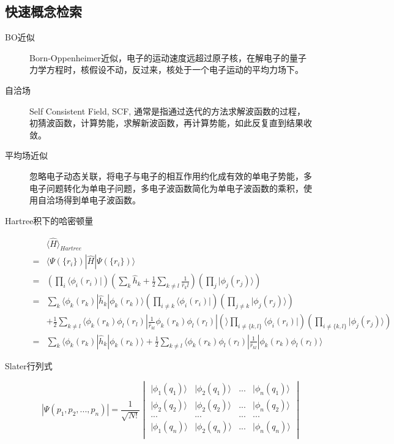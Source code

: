 \documentclass{article}
\numberwithin{equation}{section}
\newcommand{\bra}[1]{\langle #1 |}
\newcommand{\ket}[1]{| #1 \rangle}
\newcommand{\bracketl}[3]{\langle #1 | #2 | #3 \rangle}
\newcommand{\mean}[1]{\langle #1 \rangle}
\begin{document}
    \subsection{快速概念检索}
    \begin{description}
      \item[BO近似] Born-Oppenheimer近似，电子的运动速度远超过原子核，在解电子的量子力学方程时，核假设不动，反过来，核处于一个电子运动的平均力场下。
       
      \item[自洽场] Self Consistent Field, SCF, 通常是指通过迭代的方法求解波函数的过程，初猜波函数，计算势能，求解新波函数，再计算势能，如此反复直到结果收敛。
      
      \item[平均场近似] 忽略电子动态关联，将电子与电子的相互作用约化成有效的单电子势能，多电子问题转化为单电子问题，多电子波函数简化为单电子波函数的乘积，使用自洽场得到单电子波函数。
       
      \item[Hartree积下的哈密顿量] 
      \begin{align*}
        &\mean{\hat{H}}_{Hartree} \\
        =& \bracketl{\Psi(\{r_i\})}{\hat{H}}{\Psi(\{r_i\})}\\
        =&(\prod_i\bra{\phi_i(r_i)})(\sum_k\hat{h}_k+\frac{1}{2}\sum_{k\neq l}\frac{1}{\hat{r}_kl})(\prod_j\ket{\phi_j(r_j)})\\
        =&\sum_k\bracketl{\phi_k(r_k)}{\hat{h}_k}{\phi_k(r_k)}(\prod_{i\neq k}\bra{\phi_i(r_i)})(\prod_{j \neq k}\ket{\phi_j(r_j)})\\
        &+\frac{1}{2}\sum_{k \neq l}\bracketl{\phi_k(r_k)\phi_l(r_l)}{\frac{1}{\hat{r}_{kl}}\phi_k(r_k)\phi_l(r_l)}(\prod_{i \neq \{k,l\}}\bra{\phi_i(r_i)})(\prod_{i \neq \{k,l\}}\ket{\phi_j(r_j)})\\
        =&\sum_k\bracketl{\phi_k(r_k)}{\hat{h}_k}{\phi_k(r_k)}+\frac{1}{2}\sum_{k \neq l}\bracketl{\phi_k(r_k)\phi_l(r_l)}{\frac{1}{\hat{r}_{kl}}}{\phi_k(r_k)\phi_l(r_l)}
      \end{align*} 

      \item[Slater行列式]
      \begin{equation}
        |\Psi(p_1,p_2,...,p_n)|=\frac{1}{\sqrt{N!}}
        \begin{vmatrix}
        \ket{\phi_1(q_1)} & \ket{\phi_2(q_1)} & ... & \ket{\phi_n(q_1)}\\
        \ket{\phi_2(q_2)} & \ket{\phi_2(q_2)} & ... & \ket{\phi_n(q_2)}\\
        ... & ...& ... & ...\\
        \ket{\phi_1(q_n)} & \ket{\phi_2(q_n)} & ... & \ket{\phi_n(q_n)}\\
        \end{vmatrix}
      \end{equation}
  

\end{description}
\end{document}
